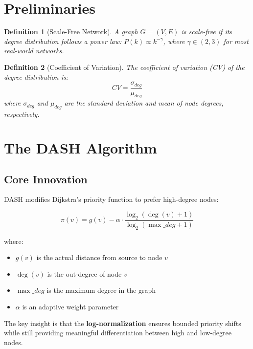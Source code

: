 \documentclass[11pt,a4paper]{article}
\newtheorem{definition}{Definition}
\begin{document}
\section{Preliminaries}

\begin{definition}[Scale-Free Network]
A graph $G = (V, E)$ is scale-free if its degree distribution follows a 
power law: $P(k) \propto k^{-\gamma}$, where $\gamma \in (2, 3)$ for most 
real-world networks.
\end{definition}

\begin{definition}[Coefficient of Variation]
The coefficient of variation (CV) of the degree distribution is:
$$CV = \frac{\sigma_{deg}}{\mu_{deg}}$$
where $\sigma_{deg}$ and $\mu_{deg}$ are the standard deviation and mean 
of node degrees, respectively.
\end{definition}

\section{The DASH Algorithm}

\subsection{Core Innovation}

DASH modifies Dijkstra's priority function to prefer high-degree nodes:

\begin{equation}
\pi(v) = g(v) - \alpha \cdot \frac{\log_2(\deg(v) + 1)}{\log_2(\max\_deg + 1)}
\label{eq:dash}
\end{equation}

where:
\begin{itemize}
    \item $g(v)$ is the actual distance from source to node $v$
    \item $\deg(v)$ is the out-degree of node $v$
    \item $\max\_deg$ is the maximum degree in the graph
    \item $\alpha$ is an adaptive weight parameter
\end{itemize}

The key insight is that the \textbf{log-normalization} ensures bounded 
priority shifts while still providing meaningful differentiation between 
high and low-degree nodes.
\end{document}
